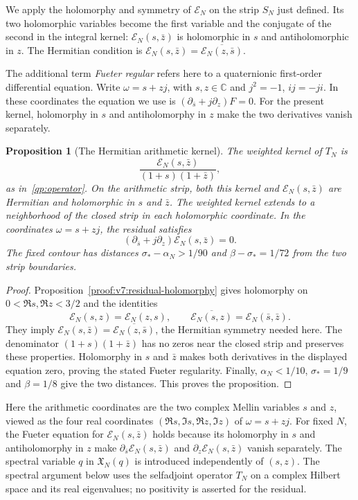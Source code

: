 \documentclass[12pt,a4paper]{amsart}
\numberwithin{equation}{section}
\theoremstyle{plain}
\newtheorem{proposition}{Proposition}[section]
\theoremstyle{definition}
\theoremstyle{remark}
\begin{document}
We apply the holomorphy and symmetry of $\mathscr E_N$ on the
strip $S_N$ just defined. Its two holomorphic variables become the
first variable and the conjugate of the second in the integral
kernel: $\mathscr E_N(s,\bar z)$ is holomorphic in $s$ and
antiholomorphic in $z$. The Hermitian condition is
$\mathscr E_N(s,\bar z)=\overline{\mathscr E_N(z,\bar s)}$.

The additional term \emph{Fueter regular} refers here to a
quaternionic first-order differential equation. Write
$\omega=s+zj$, with $s,z\in\mathbb C$ and $j^2=-1$, $ij=-ji$.
In these coordinates the equation we use is
$(\partial_{\bar s}+j\partial_z)F=0$. For the present kernel,
holomorphy in $s$ and antiholomorphy in $z$ make the two
derivatives vanish separately.

\begin{proposition}[The Hermitian arithmetic kernel]
\label{proof:v9:hermitian-kernel}
The weighted kernel of $T_N$ is
\[
 \frac{\mathscr E_N(s,\bar z)}{(1+s)(1+\bar z)},
\]
as in~\eqref{qp:operator}.
On the arithmetic strip, both this kernel and $\mathscr E_N(s,\bar z)$
are Hermitian and holomorphic in $s$ and $\bar z$. The weighted kernel
extends to a neighborhood of the closed strip in each holomorphic
coordinate.
In the coordinates $\omega=s+zj$, the residual satisfies
\[
 (\partial_{\bar s}+j\partial_z)\mathscr E_N(s,\bar z)=0.
\]
The fixed contour has distances $\sigma_*-\alpha_N>1/90$ and
$\beta-\sigma_*=1/72$ from the two strip boundaries.
\end{proposition}

\begin{proof}
Proposition~\ref{proof:v7:residual-holomorphy} gives holomorphy
on $0<\Re s,\Re z<3/2$ and the identities
\[
 \mathscr E_N(s,z)=\mathscr E_N(z,s),\qquad
 \overline{\mathscr E_N(s,z)}=\mathscr E_N(\bar s,\bar z).
\]
They imply $\mathscr E_N(s,\bar z)
=\overline{\mathscr E_N(z,\bar s)}$, the Hermitian symmetry needed here.
The denominator $(1+s)(1+\bar z)$ has no zeros near the closed
strip and preserves these properties. Holomorphy in $s$ and
$\bar z$ makes both derivatives in the displayed equation zero,
proving the stated Fueter regularity.
Finally, $\alpha_N<1/10$, $\sigma_*=1/9$ and $\beta=1/8$
give the two distances.
This proves the proposition.
\end{proof}

Here the arithmetic coordinates are the two complex Mellin variables
$s$ and $z$, viewed as the four real coordinates
$(\Re s,\Im s,\Re z,\Im z)$ of $\omega=s+zj$. For fixed $N$,
the Fueter equation for $\mathscr E_N(s,\bar z)$ holds because its
holomorphy in $s$ and antiholomorphy in $z$ make
$\partial_{\bar s}\mathscr E_N(s,\bar z)$ and
$\partial_z\mathscr E_N(s,\bar z)$ vanish separately.
The spectral variable $q$ in $\mathfrak X_N(q)$ is introduced
independently of $(s,z)$. The spectral argument below uses the
selfadjoint operator $T_N$ on a complex Hilbert space and its real
eigenvalues; no positivity is asserted for the residual.
\end{document}

